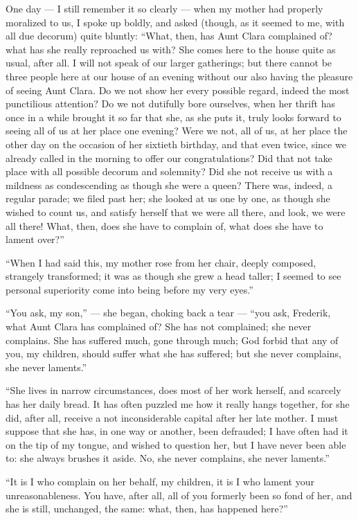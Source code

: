 \documentclass[12pt,a4paper]{book}
\begin{document}
One day --- I still remember it so clearly --- when my mother had properly moralized to us, I spoke up boldly, and asked (though, as it seemed to me, with all due decorum) quite bluntly: ``What, then, has Aunt Clara complained of? what has she really reproached us with? She comes here to the house quite as usual, after all. I will not speak of our larger gatherings; but there cannot be three people here at our house of an evening without our also having the pleasure of seeing Aunt Clara. Do we not show her every possible regard, indeed the most punctilious attention? Do we not dutifully bore ourselves, when her thrift has once in a while brought it so far that she, as she puts it, truly looks forward to seeing all of us at her place one evening? Were we not, all of us, at her place the other day on the occasion of her sixtieth birthday, and that even twice, since we already called in the morning to offer our congratulations? Did that not take place with all possible decorum and solemnity? Did she not receive us with a mildness as condescending as though she were a queen? There was, indeed, a regular parade; we filed past her; she looked at us one by one, as though she wished to count us, and satisfy herself that we were all there, and look, we were all there! What, then, does she have to complain of, what does she have to lament over?''

``When I had said this, my mother rose from her chair, deeply composed, strangely transformed; it was as though she grew a head taller; I seemed to see personal superiority come into being before my very eyes.''

``You ask, my son,'' --- she began, choking back a tear --- ``you ask, Frederik, what Aunt Clara has complained of? She has not complained; she never complains. She has suffered much, gone through much; God forbid that
any of you, my children, should suffer what she has suffered; but she never complains, she never laments.''

``She lives in narrow circumstances, does most of her work herself, and scarcely has her daily bread. It has often puzzled me how it really hangs together, for she did, after all, receive a not inconsiderable capital after her late mother. I must suppose that she has, in one way or another, been defrauded; I have often had it on the tip of my tongue, and wished to question her, but I have never been able to: she always brushes it aside. No, she never complains, she never laments.''

``It is I who complain on her behalf, my children, it is I who lament your unreasonableness. You have, after all, all of you formerly been so fond of her, and she is still, unchanged, the same: what, then, has happened here?''
\end{document}
